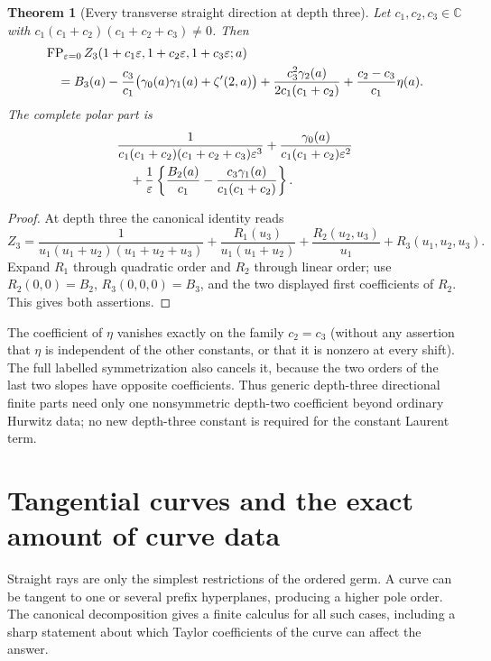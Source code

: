 \documentclass[11pt,letterpaper]{article}
\numberwithin{equation}{section}
\newtheorem{theorem}{Theorem}[section]
\theoremstyle{definition}
\theoremstyle{remark}
\begin{document}
\begin{theorem}[Every transverse straight direction at depth three]
\label{ord:threedirections}
Let $c_1,c_2,c_3\in\mathbb C$ with
$c_1(c_1+c_2)(c_1+c_2+c_3)\ne0$. Then
\begin{align}\label{ord:threeFP}
 &\operatorname{FP}_{\varepsilon=0}
 Z_3(1+c_1\varepsilon,1+c_2\varepsilon,1+c_3\varepsilon;a)
 \notag\\
 &\quad=B_3(a)-\frac{c_3}{c_1}
       \bigl(\gamma_0(a)\gamma_1(a)+\zeta'(2,a)\bigr)
 +\frac{c_3^2\gamma_2(a)}{2c_1(c_1+c_2)}
 +\frac{c_2-c_3}{c_1}\eta(a).
\end{align}
The complete polar part is
\begin{align}\label{ord:threepoles}
 &\frac{1}{c_1(c_1+c_2)(c_1+c_2+c_3)\varepsilon^3}
 +\frac{\gamma_0(a)}{c_1(c_1+c_2)\varepsilon^2}\notag\\
 &\quad+\frac1\varepsilon
 \left\{\frac{B_2(a)}{c_1}
       -\frac{c_3\gamma_1(a)}{c_1(c_1+c_2)}\right\}.
\end{align}
\end{theorem}

\begin{proof}
At depth three the canonical identity reads
\[
 Z_3=\frac1{u_1(u_1+u_2)(u_1+u_2+u_3)}
 +\frac{R_1(u_3)}{u_1(u_1+u_2)}
 +\frac{R_2(u_2,u_3)}{u_1}+R_3(u_1,u_2,u_3).
\]
Expand $R_1$ through quadratic order and $R_2$ through linear order;
use $R_2(0,0)=B_2$, $R_3(0,0,0)=B_3$, and the two displayed
first coefficients of $R_2$. This gives both assertions.
\end{proof}

The coefficient of $\eta$ vanishes exactly on the family $c_2=c_3$
(without any assertion that $\eta$ is independent of the other constants,
or that it is nonzero at every shift).
The full labelled symmetrization also cancels it, because the two
orders of the last two slopes have opposite coefficients.
Thus generic depth-three directional finite parts need only one
nonsymmetric depth-two coefficient beyond ordinary Hurwitz data;
no new depth-three constant is required for the constant Laurent term.




\section{Tangential curves and the exact amount of curve data}
\label{sec:curves}

Straight rays are only the simplest restrictions of the ordered germ.
A curve can be tangent to one or several prefix hyperplanes, producing
a higher pole order. The canonical decomposition gives a finite
calculus for all such cases, including a sharp statement about which
Taylor coefficients of the curve can affect the answer.
\end{document}
